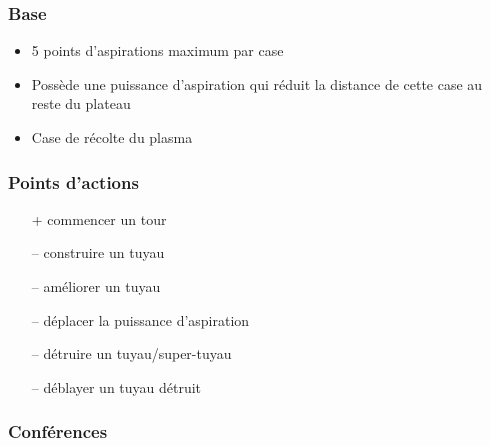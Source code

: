 \documentclass{beamer}
\begin{document}
\begin{frame}
	\frametitle{Base}
        \begin{itemize}
        \item 5 points d'aspirations maximum par case
        \item Possède une puissance d'aspiration qui réduit la distance de cette case au reste du plateau
        \item Case de récolte du plasma
	\end{itemize}
\end{frame}

\begin{frame}
	\frametitle{Points d'actions}
	\begin{itemize}
	\item[+] commencer un tour
	\item[\alert{--}] construire un tuyau
	\item[\alert{--}] améliorer un tuyau
	\item[\alert{--}] déplacer la puissance d'aspiration
	\item[\alert{--}] détruire un tuyau/super-tuyau
	\item[\alert{--}] déblayer un tuyau détruit
	\end{itemize}
\end{frame}

\begin{frame}
    \frametitle{Conférences}
\end{frame}
\end{document}
